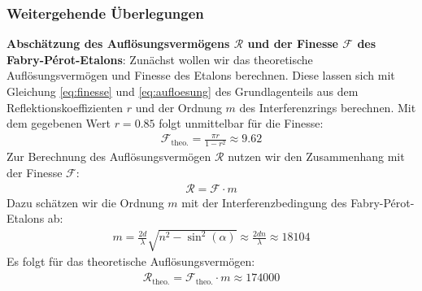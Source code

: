 \documentclass[11pt, a4paper]{article}
\begin{document}
\subsubsection{Weitergehende Überlegungen}
\textbf{Abschätzung des Auflösungsvermögens $\mathcal{R}$ und der Finesse $\mathcal{F}$ des Fabry-Pérot-Etalons}:
Zunächst wollen wir das theoretische Auflösungsvermögen und Finesse des Etalons berechnen.
Diese lassen sich mit Gleichung \ref{eq:finesse} und \ref{eq:aufloesung} des Grundlagenteils aus dem Reflektionskoeffizienten $r$ und der Ordnung $m$ des Interferenzrings berechnen.
Mit dem gegebenen Wert $r = \num{0,85}$ folgt unmittelbar für die Finesse:
\begin{align*}
	\mathcal{F_\mathrm{theo.}} = \frac{\pi r}{1 - r^2} \approx \num{9.62}
\end{align*}
Zur Berechnung des Auflösungsvermögen $\mathcal{R}$ nutzen wir den Zusammenhang mit der Finesse $\mathcal{F}$:
\begin{align}
\mathcal{R} = \mathcal{F} \cdot m
\end{align}
Dazu schätzen wir die Ordnung $m$ mit der Interferenzbedingung des Fabry-Pérot-Etalons ab:
\begin{align*}
m = \frac{2 d}{\lambda} \sqrt{n^2 - \sin^2(\alpha)} \approx \frac{2 d n}{\lambda} \approx 18104
\end{align*}
Es folgt für das theoretische Auflösungsvermögen:
\begin{align*}
	\mathcal{R}_\mathrm{theo.} = \mathcal{F}_\mathrm{theo.} \cdot m  \approx \num{174000}
\end{align*}
\end{document}
